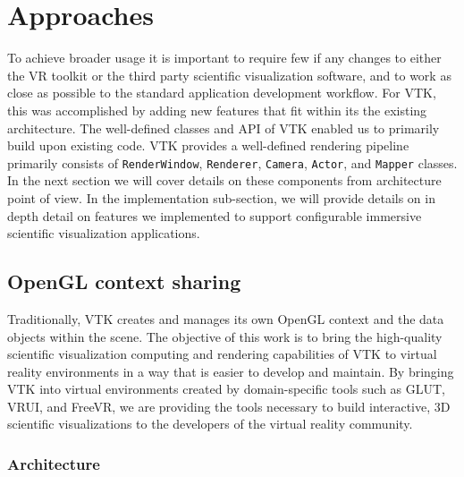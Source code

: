 \section{Approaches}

To achieve broader usage it is important to require few if any changes to either the VR toolkit or the third party scientific visualization software, and to work as close as possible to the standard application development workflow. For VTK, this was accomplished by adding new features that fit within its the existing architecture.  The well-defined classes and API of VTK enabled us to primarily build upon existing code. VTK provides a well-defined rendering pipeline primarily consists of \texttt{RenderWindow}, \texttt{Renderer}, \texttt{Camera}, \texttt{Actor}, and \texttt{Mapper} classes. In the next section we will cover details on these components from architecture point of view. In the implementation sub-section, we will provide details on in depth detail on features we implemented to support configurable immersive scientific visualization applications. 

\subsection{OpenGL context sharing}

Traditionally, VTK creates and manages its own OpenGL context and the data objects within the scene. The objective of this work is to bring the high-quality scientific visualization computing and rendering capabilities of VTK to virtual reality environments in a way that is easier to develop and maintain. By bringing VTK into virtual environments created by domain-specific tools such as GLUT, VRUI, and FreeVR, we are providing the tools necessary to build interactive, 3D scientific visualizations to the developers of the virtual reality community.

\subsubsection{Architecture}

